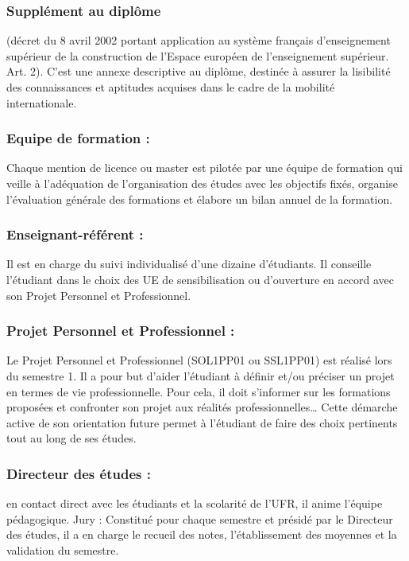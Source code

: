 \documentclass[10pt, a5paper]{report}
\begin{document}
\begin{spacing}{1.5}
\subsubsection*{Supplément au diplôme} 

(décret du 8 avril 2002 portant application au système français d’enseignement supérieur de la construction de l’Espace européen de l’enseignement supérieur. Art. 2). C’est une annexe descriptive au diplôme,  destinée à assurer la lisibilité des connaissances et aptitudes acquises dans le cadre de la mobilité internationale.

\subsubsection*{Equipe de formation :} Chaque mention de licence ou master est pilotée par une équipe de formation qui veille à l’adéquation de l’organisation des études avec les objectifs fixés, organise l’évaluation générale des formations et élabore  un bilan annuel de la formation.

\subsubsection*{Enseignant-référent :} Il est en charge du suivi individualisé d’une dizaine d’étudiants. Il conseille l’étudiant dans le choix des UE de sensibilisation ou d’ouverture en accord avec son Projet Personnel et Professionnel.

\subsubsection*{Projet Personnel et Professionnel :} Le Projet Personnel et Professionnel (SOL1PP01 ou SSL1PP01) est réalisé lors du semestre 1. Il a pour but d’aider l’étudiant à définir et/ou préciser un projet en termes de vie professionnelle. Pour cela, il doit s’informer sur les formations proposées et confronter son projet aux réalités professionnelles… Cette démarche active de son orientation future permet à l’étudiant de faire des choix pertinents tout au long de ses études.

\subsubsection*{Directeur des études :} en contact direct avec les étudiants et la scolarité de l’UFR, il anime l’équipe pédagogique.
Jury : Constitué pour chaque semestre et présidé par le Directeur des études, il a en charge le recueil des notes, l’établissement des moyennes et la validation du semestre.


\end{spacing}
\end{document}
